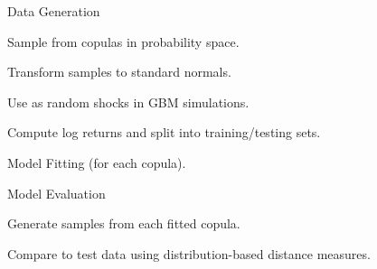 \begin{generalinstructions}
    \begin{compactenum}
        \item Data Generation
        \begin{compactenum}
            \item Sample from copulas in probability space.
            \item Transform samples to standard normals.
            \item Use as random shocks in GBM simulations.
            \item Compute log returns and split into training/testing sets.
        \end{compactenum}
        \item Model Fitting (for each copula).
        \item Model Evaluation
        \begin{compactenum}
            \item Generate samples from each fitted copula.
            \item Compare to test data using distribution-based distance measures.
        \end{compactenum}
    \end{compactenum}
\end{generalinstructions}



































